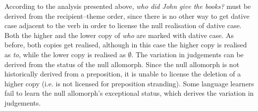 \begin{exe}
\ex \label{ex:whovar}
\begin{xlist}
\end{xlist}
\end{exe}%
According to the analysis presented above, \textit{who did John give the books?} must be derived from the recipient--theme order, since there is no other way to get dative case adjacent to the verb in order to license the null realisation of dative case. Both the higher and the lower copy of \textit{who} are marked with dative case. As before, both copies get realised, although in this case the higher copy is realised as \textit{to}, while the lower copy is realised as \textit{$\emptyset$}. The variation in judgements can be derived from the status of the null allomorph. Since the null allomorph is not historically derived from a preposition, it is unable to license the deletion of a higher copy (i.e. is not licensed for preposition stranding). Some language learners fail to learn the null allomorph's exceptional status, which derives the variation in judgements.
\begin{exe}
\ex
\begin{xlist}
\end{xlist}
\end{exe}%

